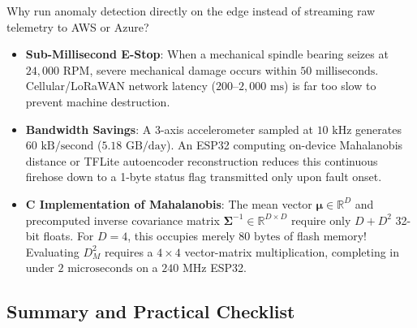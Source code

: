 \begin{iotbox}
Why run anomaly detection directly on the edge instead of streaming raw telemetry to AWS or Azure?
\begin{itemize}
    \item \textbf{Sub-Millisecond E-Stop}: When a mechanical spindle bearing seizes at $24{,}000\text{ RPM}$, severe mechanical damage occurs within $50\text{ milliseconds}$. Cellular/LoRaWAN network latency ($200\text{--}2{,}000\text{ ms}$) is far too slow to prevent machine destruction.
    \item \textbf{Bandwidth Savings}: A 3-axis accelerometer sampled at $10\text{ kHz}$ generates $60\text{ kB/second}$ ($5.18\text{ GB/day}$). An ESP32 computing on-device Mahalanobis distance or TFLite autoencoder reconstruction reduces this continuous firehose down to a 1-byte status flag transmitted only upon fault onset.
    \item \textbf{C Implementation of Mahalanobis}: The mean vector $\boldsymbol{\mu} \in \mathbb{R}^D$ and precomputed inverse covariance matrix $\mathbf{\Sigma}^{-1} \in \mathbb{R}^{D \times D}$ require only $D + D^2$ 32-bit floats. For $D = 4$, this occupies merely $80\text{ bytes}$ of flash memory! Evaluating $D_M^2$ requires a $4 \times 4$ vector-matrix multiplication, completing in under $2\text{ microseconds}$ on a $240\text{ MHz}$ ESP32.
\end{itemize}
\end{iotbox}

\subsection{Summary and Practical Checklist}\label{subsec:anomaly_summary}

